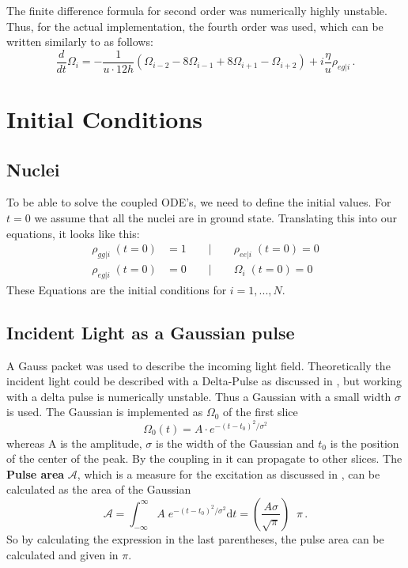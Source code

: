 The finite difference formula for second order was numerically highly unstable. Thus, for the actual implementation, the fourth order was used, which can be written similarly to  as follows:
\begin{equation}
    \frac{d}{dt} \Omega_i = -\frac{1}{u  \cdot 12h}  (\Omega_{i-2} - 8\Omega_{i-1} + 8\Omega_{i+1}- \Omega_{i+2} )+ i \frac{\eta}{u} \rho_{eg|i} \, .\label{fourth_order}
\end{equation}


\section{Initial Conditions}
\subsection{Nuclei}
To be able to solve the coupled ODE's, we need to define the initial values. For $t=0$ we assume that all the nuclei are in ground state. Translating this into our equations, it looks like this:
\begin{equation}
    \begin{aligned}
      \rho_{gg|i}\;(t=0) &= 1 \quad\quad |\quad\quad \rho_{ee|i}\;(t=0) = 0 \\
      \rho_{eg|i}\;(t=0) &= 0 \quad\quad |\quad\quad \Omega_i\;(t=0) = 0
    \end{aligned}
\end{equation}
These Equations are the initial conditions for $i =1,...,N$.


\subsection{Incident Light as a Gaussian pulse}
A Gauss packet was used to describe the incoming light field. Theoretically the incident light could be described with a Delta-Pulse as discussed in , but working with a delta pulse is numerically unstable. Thus a Gaussian with a small width $\sigma$ is used. The Gaussian is implemented as $\Omega_0$ of the first slice
\begin{equation}
    \Omega_0(t) = A \cdot e^{-(t-t_0)^2/\sigma^2}
\end{equation}
whereas A is the amplitude, $\sigma$ is the width of the Gaussian and $t_0$ is the position of the center of the peak. By the coupling in  it can propagate to other slices. The \textbf{Pulse area} $\mathbf{\mathcal{A}}$, which is a measure for the excitation as discussed in , can be calculated as the area of the Gaussian
\begin{equation}
    \mathcal{A} = \int_{-\infty}^{\infty} A \; e^{-(t-t_0)^2/\sigma^2} \mathrm{d}t =  \left( \frac{A \sigma}{\sqrt{\pi}} \right)\;\; \pi\, . \label{pulse_are_calc}
\end{equation}
So by calculating the expression in the last parentheses, the pulse area can be calculated and given in $\pi$. 

